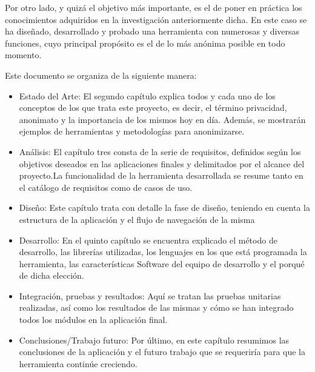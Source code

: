 Por otro lado, y quizá el objetivo más importante, es el de poner en
práctica los conocimientos adquiridos en la investigación
anteriormente dicha. En este caso se ha diseñado, desarrollado y
probado una herramienta con numerosas y diversas funciones, cuyo
principal propósito es el de  lo más
anónima posible en todo momento.





Este documento se organiza de la siguiente manera:
\begin{itemize}
	\item Estado  del  Arte: El segundo capítulo explica todos y cada uno de los conceptos de los que trata este proyecto, es decir, el término privacidad, anonimato y la importancia de los mismos hoy en día. Además, se mostrarán ejemplos de herramientas y metodologías para anonimizarse. 
	\item Análisis: El capítulo tres consta de la serie de requisitos, definidos  según  los objetivos  deseados  en  las  aplicaciones  finales  y  delimitados  por  el  alcance  del proyecto.La funcionalidad de la herramienta desarrollada se resume tanto en el catálogo de requisitos como de casos de uso.
	\item Diseño: Este capítulo trata con detalle la fase de diseño, teniendo en cuenta la estructura de la aplicación y el flujo de navegación de la misma 
	\item Desarrollo: En el quinto capítulo se encuentra explicado el método de desarrollo, las librerías utilizadas, los lenguajes en los que está programada la herramienta, las características Software del equipo de desarrollo y el porqué de dicha elección.
	\item Integración, pruebas y resultados: Aquí se tratan las pruebas unitarias realizadas, así como los resultados de las mismas y cómo se han integrado todos los módulos en la aplicación final.
	\item Conclusiones/Trabajo  futuro: Por último, en este capítulo resumimos las conclusiones de la aplicación y el futuro trabajo que se requeriría para que la herramienta continúe creciendo.
\end{itemize}

\newpage \thispagestyle{empty} %